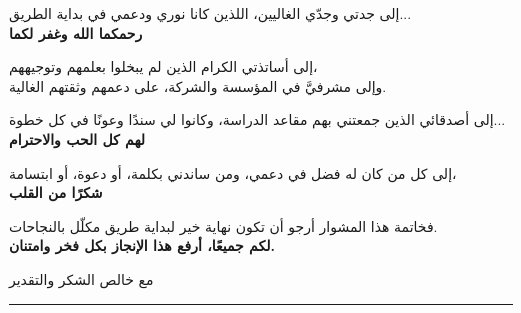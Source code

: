 {\begin{center}
		\vspace{0.2cm}
		
		\textarabic{إلى جدتي وجدّي الغاليين، اللذين كانا نوري ودعمي في بداية الطريق...}\\
		\textarabic{\textbf{رحمكما الله وغفر لكما}}
		
		\vspace{0.2cm}
		
		\textarabic{إلى أساتذتي الكرام الذين لم يبخلوا بعلمهم وتوجيههم،}\\
		\textarabic{وإلى مشرفيَّ في المؤسسة والشركة، على دعمهم وثقتهم الغالية.}
		
		\vspace{0.1cm}
		
		\textarabic{إلى أصدقائي الذين جمعتني بهم مقاعد الدراسة، وكانوا لي سندًا وعونًا في كل خطوة...}\\
		\textarabic{\textbf{لهم كل الحب والاحترام}}
		
		\vspace{0.2cm}
		
		\textarabic{إلى كل من كان له فضل في دعمي، ومن ساندني بكلمة، أو دعوة، أو ابتسامة،}\\
		\textarabic{\textbf{شكرًا من القلب}}
		
		\vspace{0.2cm}
		
		\textarabic{\large فخاتمة هذا المشوار أرجو أن تكون نهاية خير لبداية طريق مكلّل بالنجاحات.}\\
		\vspace{0.2cm}
		\textarabic{ \textbf{لكم جميعًا، أرفع هذا الإنجاز بكل فخر وامتنان.}}
		
		\vspace{0.2cm}
		
		\textarabic{مع خالص الشكر والتقدير}\\
		\rule{5cm}{0.5pt}
\end{center}}

